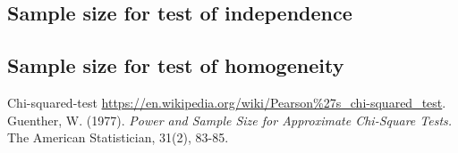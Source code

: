 \documentclass{article}
\begin{document}
\subsection{Sample size for test of independence}
\subsection{Sample size for test of homogeneity}

\begin{thebibliography}{9}
    Chi-squared-test 
    \url{https://en.wikipedia.org/wiki/Pearson\%27s\_chi-squared\_test}.
    Guenther, W. (1977). 
    \textit{Power and Sample Size for Approximate Chi-Square Tests.} 
    The American Statistician, 31(2), 83-85.

\end{thebibliography}   
\end{document}

